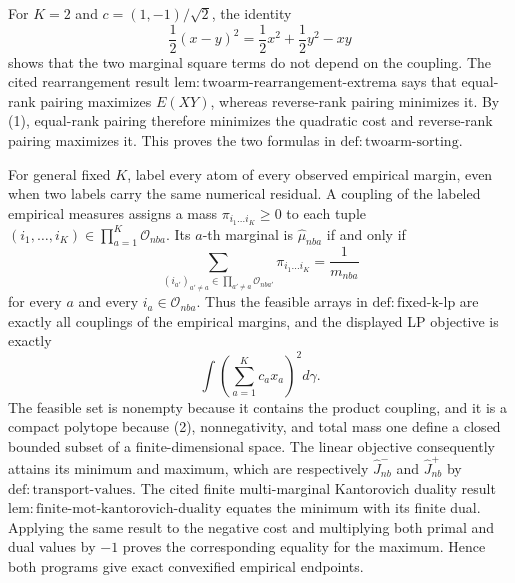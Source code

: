 For \(K=2\) and \(c=(1,-1)/\sqrt2\), the identity
\[
\frac12(x-y)^2=\frac12x^2+\frac12y^2-xy
\tag{1}
\]
shows that the two marginal square terms do not depend on the coupling. The cited rearrangement result \(\mathrm{lem:twoarm\text{-}rearrangement\text{-}extrema}\) says that equal-rank pairing maximizes \(E(XY)\), whereas reverse-rank pairing minimizes it. By (1), equal-rank pairing therefore minimizes the quadratic cost and reverse-rank pairing maximizes it. This proves the two formulas in \(\mathrm{def:twoarm\text{-}sorting}\).

For general fixed \(K\), label every atom of every observed empirical margin, even when two labels carry the same numerical residual. A coupling of the labeled empirical measures assigns a mass \(\pi_{i_1\ldots i_K}\ge0\) to each tuple
\((i_1,\ldots,i_K)\in\prod_{a=1}^K\mathcal O_{nba}\). Its \(a\)-th marginal is \(\widehat\mu_{nba}\) if and only if
\[
\sum_{(i_{a'})_{a'\ne a}\in\prod_{a'\ne a}\mathcal O_{nba'}}
\pi_{i_1\ldots i_K}=\frac1{m_{nba}}
\tag{2}
\]
for every \(a\) and every \(i_a\in\mathcal O_{nba}\). Thus the feasible arrays in \(\mathrm{def:fixed\text{-}k\text{-}lp}\) are exactly all couplings of the empirical margins, and the displayed LP objective is exactly
\[
\int\left(\sum_{a=1}^Kc_ax_a\right)^2d\gamma.
\]
The feasible set is nonempty because it contains the product coupling, and it is a compact polytope because (2), nonnegativity, and total mass one define a closed bounded subset of a finite-dimensional space. The linear objective consequently attains its minimum and maximum, which are respectively \(\widehat J_{nb}^{-}\) and \(\widehat J_{nb}^{+}\) by \(\mathrm{def:transport\text{-}values}\). The cited finite multi-marginal Kantorovich duality result \(\mathrm{lem:finite\text{-}mot\text{-}kantorovich\text{-}duality}\) equates the minimum with its finite dual. Applying the same result to the negative cost and multiplying both primal and dual values by \(-1\) proves the corresponding equality for the maximum. Hence both programs give exact convexified empirical endpoints.

